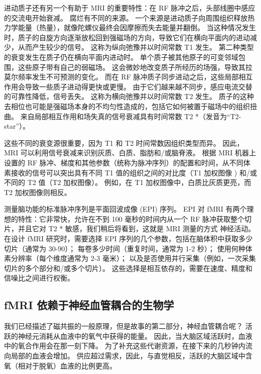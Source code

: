 进动质子还有另一个有助于 MRI 的重要特性：在 RF 脉冲之后，头部线圈中感应的交流电开始衰减。 
腐烂有不同的来源。 
一个来源是进动质子向周围组织释放热力学能量（热量），就像陀螺仪最终会因摩擦而失去能量并翻倒。 
当这种情况发生时，质子的自旋方向逐渐放松回到强磁场的方向，导致它们在横向平面内的进动减少，从而产生较少的信号。 
这称为纵向弛豫并以时间常数 T1 发生。 
第二种类型的衰变发生在质子仍在横向平面内进动时。 
单个质子被其他原子的可变邻域包围，这些原子带有自己的弱磁场。 
这会微妙地改变质子所经历的场强，导致其拉莫尔频率发生不可预测的变化。 
而在 RF 脉冲质子同步进动之后，这些局部相互作用会导致一些质子进动得更快或更慢。 
由于它们越来越不同步，感应电流交替的可靠性降低，信号丢失。 
这称为横向弛豫并以时间常数 T2 发生。 
质子的这种去相位也可能是强磁场本身的不均匀性造成的，包括它如何被置于磁场中的组织扭曲。 
来自局部相互作用和场失真的信号衰减具有时间常数 T2 *（发音为“T2-star”）。


这些不同的衰变源很重要，因为 T1 和 T2 时间常数因组织类型而异。 
因此，MRI 可以利用信号衰减来识别灰质、白质、脂肪和/或脑脊液。 
根据 MRI 机器上设置的 RF 脉冲、梯度和其他参数（统称为脉冲序列）的配置和时间，从不同体素接收的信号可以突出具有不同 T1 值的组织之间的对比度（T1 加权图像 ) 和/或不同的 T2 值（T2 加权图像）。 
例如，在 T1 加权图像中，白质比灰质更亮，而 T2 加权图像则相反。


测量脑功能的标准脉冲序列是平面回波成像 (EPI) 序列。 
EPI 对 fMRI 有两个理想的特性：它非常快，允许在不到 100 毫秒的时间内从一个 RF 脉冲获取整个切片，并且它对 T2 * 敏感，我们稍后将看到，这就是 MRI 测量的方式 神经活动。 
在设计 fMRI 研究时，需要选择 EPI 序列的几个参数，包括在脑体积中获取多少切片（通常为 30-90）； 
每卷多少时间（重复时间，通常为 1-2 秒）； 使用何种体素分辨率（每个维度通常为 2-3 毫米）； 
以及是否使用并行采集（例如，一次采集切片的多个部分和/或多个切片）。 
这些选择是相互依存的，需要在速度、精度和信噪比之间进行权衡。


\subsection{fMRI 依赖于神经血管耦合的生物学}
我们已经描述了磁共振的一般原理，但是故事的第二部分，神经血管耦合呢？ 
活跃的神经元消耗从血液中的氧气中获得的能量。 
因此，当大脑区域活跃时，血液中的氧合作用会在那一刻下降。
为了补充这些代谢资源，在接下来的几秒钟内流向局部的血液会增加。 
供应超过需求，因此，与直觉相反，活跃的大脑区域中含氧（相对于脱氧）血液的比例更高。



